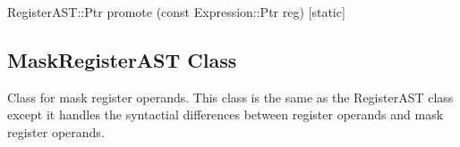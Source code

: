 \begin{apient}
  RegisterAST::Ptr promote (const Expression::Ptr reg) [static]
\end{apient}


\subsection{MaskRegisterAST Class}
\label{sec:MaskRegisterAST}

Class for mask register operands. This class is the same as the RegisterAST
class except it handles the syntactial differences between register operands
and mask register operands.
